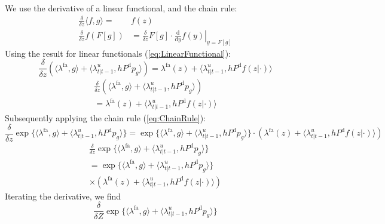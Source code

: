 \documentclass[journal,twoside]{IEEEtran}
\theoremstyle{plain}
\begin{document}
\begin{IEEEproof}
We use the derivative of a linear functional, and the chain rule: \cite[p395]{Mah07}
%
\begin{align}
\frac{\delta}{\delta z}\langle f,g\rangle =& f(z) \label{eq:LinearFunctional} \\
\frac{\delta}{\delta z} f(F[g]) &= 
\frac{\delta}{\delta z}F[g] \cdot \left.\frac{\mathrm{d}}{\mathrm{d} y} f(y)\right|_{y=F[g]} \label{eq:ChainRule}
\end{align}
%
Using the result for linear functionals (\ref{eq:LinearFunctional}):
%
\ifCLASSOPTIONdraftcls
\begin{equation}
\frac{\delta}{\delta z} \left( \langle\lambda^\mathrm{fa},g\rangle + \langle\lambda^u_{t|t-1},h P^{\mathrm{d}} p_g\rangle \right) 
= \lambda^\mathrm{fa}(z) + \langle\lambda^u_{t|t-1},h P^{\mathrm{d}} f(z|\cdot)\rangle
\end{equation}
\else
\begin{multline}
\frac{\delta}{\delta z} \left( \langle\lambda^\mathrm{fa},g\rangle + \langle\lambda^u_{t|t-1},h P^{\mathrm{d}} p_g\rangle \right) \\
= \lambda^\mathrm{fa}(z) + \langle\lambda^u_{t|t-1},h P^{\mathrm{d}} f(z|\cdot)\rangle
\end{multline}
\fi
%
Subsequently applying the chain rule (\ref{eq:ChainRule}):
%
\ifCLASSOPTIONdraftcls
\begin{equation}
\frac{\delta}{\delta z} \exp\{ \langle\lambda^\mathrm{fa},g\rangle + \langle\lambda^u_{t|t-1},h P^{\mathrm{d}} p_g\rangle \} 
= \exp\{ \langle\lambda^\mathrm{fa},g\rangle + \langle\lambda^u_{t|t-1},h P^{\mathrm{d}} p_g\rangle \} 
\cdot ( \lambda^\mathrm{fa}(z) + \langle\lambda^u_{t|t-1},h P^{\mathrm{d}} f(z|\cdot)\rangle )
\end{equation}
\else
\begin{multline}
\frac{\delta}{\delta z} \exp\{ \langle\lambda^\mathrm{fa},g\rangle + \langle\lambda^u_{t|t-1},h P^{\mathrm{d}} p_g\rangle \} \\
= \exp\{ \langle\lambda^\mathrm{fa},g\rangle + \langle\lambda^u_{t|t-1},h P^{\mathrm{d}} p_g\rangle \}  \\
\times ( \lambda^\mathrm{fa}(z) + \langle\lambda^u_{t|t-1},h P^{\mathrm{d}} f(z|\cdot)\rangle )
\end{multline}
\fi
%
Iterating the derivative, we find
%
\ifCLASSOPTIONdraftcls
\begin{equation}
\frac{\delta}{\delta Z} \exp\{ \langle\lambda^\mathrm{fa},g\rangle + \langle\lambda^u_{t|t-1},h P^{\mathrm{d}} p_g\rangle \} 

\end{equation}
\end{IEEEproof}
\end{document}
